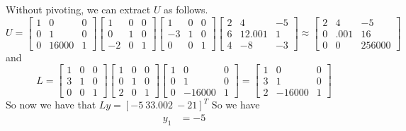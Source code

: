 \documentclass{homework}
\begin{document}
\begin{solution}
  Without pivoting, we can extract $U$ as follows.
  \[ U =
    \begin{bmatrix}
      1 & 0 & 0 \\
      0 & 1 & 0 \\
      0 & 16000 & 1
    \end{bmatrix}
    \begin{bmatrix}
      1 & 0 & 0 \\
      0 & 1 & 0 \\
      -2 & 0 & 1
    \end{bmatrix}
    \begin{bmatrix}
      1 & 0 & 0 \\
      -3 & 1 & 0 \\
      0 & 0 & 1
    \end{bmatrix}
    \begin{bmatrix}
      2 & 4 & -5 \\
      6 & 12.001 & 1 \\
      4 & -8 & -3
    \end{bmatrix}
    \approx
    \begin{bmatrix}
      2 & 4 & -5 \\
      0 & .001 & 16 \\
      0 & 0 & 256000
    \end{bmatrix}
  \]
  and 
  \[
    L = 
    \begin{bmatrix}
      1 & 0 & 0 \\
      3 & 1 & 0 \\
      0 & 0 & 1
    \end{bmatrix}
    \begin{bmatrix}
      1 & 0 & 0 \\
      0 & 1 & 0 \\
      2 & 0 & 1
    \end{bmatrix}
    \begin{bmatrix}
      1 & 0 & 0 \\
      0 & 1 & 0 \\
      0 & -16000 & 1
    \end{bmatrix}
    =
    \begin{bmatrix}
      1 & 0 & 0 \\
      3 & 1 & 0 \\
      2 & -16000 & 1
    \end{bmatrix}
  \]
  So now we have that $Ly = [-5\ 33.002\ -21]^T$
  So we have
  \[ 
    \begin{aligned}
      y_1 &= -5 \\

\end{aligned}\]
\end{solution}
\end{document}
